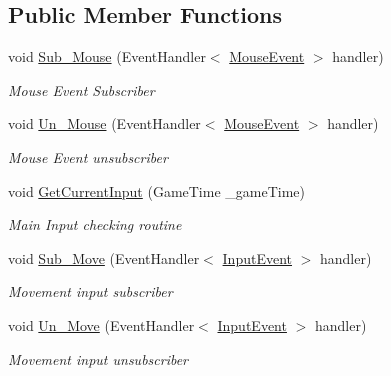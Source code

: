 \subsection*{Public Member Functions}
\begin{DoxyCompactItemize}
\item 
void \mbox{\hyperlink{interface_g_m_t_b_1_1_input_system_1_1_i_input___manager_aa3ac395ab08cf7cf51506dec5a6f0936}{Sub\+\_\+\+Mouse}} (Event\+Handler$<$ \mbox{\hyperlink{class_g_m_t_b_1_1_input_system_1_1_mouse_event}{Mouse\+Event}} $>$ handler)
\begin{DoxyCompactList}\small\item\em Mouse Event Subscriber \end{DoxyCompactList}\item 
void \mbox{\hyperlink{interface_g_m_t_b_1_1_input_system_1_1_i_input___manager_aef09d69d61e15351f0eabd51b61157c3}{Un\+\_\+\+Mouse}} (Event\+Handler$<$ \mbox{\hyperlink{class_g_m_t_b_1_1_input_system_1_1_mouse_event}{Mouse\+Event}} $>$ handler)
\begin{DoxyCompactList}\small\item\em Mouse Event unsubscriber \end{DoxyCompactList}\item 
void \mbox{\hyperlink{interface_g_m_t_b_1_1_input_system_1_1_i_input___manager_ac18c8364400155f82270785e1c5afd72}{Get\+Current\+Input}} (Game\+Time \+\_\+game\+Time)
\begin{DoxyCompactList}\small\item\em Main Input checking routine \end{DoxyCompactList}\item 
void \mbox{\hyperlink{interface_g_m_t_b_1_1_input_system_1_1_i_input___manager_aa90d83a923d091d5721c7a00be376ed4}{Sub\+\_\+\+Move}} (Event\+Handler$<$ \mbox{\hyperlink{class_g_m_t_b_1_1_input_system_1_1_input_event}{Input\+Event}} $>$ handler)
\begin{DoxyCompactList}\small\item\em Movement input subscriber \end{DoxyCompactList}\item 
void \mbox{\hyperlink{interface_g_m_t_b_1_1_input_system_1_1_i_input___manager_a7b2ca99e2877562ead23aa209162f08b}{Un\+\_\+\+Move}} (Event\+Handler$<$ \mbox{\hyperlink{class_g_m_t_b_1_1_input_system_1_1_input_event}{Input\+Event}} $>$ handler)
\begin{DoxyCompactList}\small\item\em Movement input unsubscriber \end{DoxyCompactList}\item 

\end{DoxyCompactItemize}
